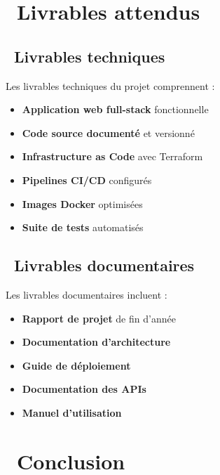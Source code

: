 \section{\faBoxes\ Livrables attendus}

\subsection{\faCode\ Livrables techniques}

Les livrables techniques du projet comprennent :

\begin{itemize}
    \item \textcolor{primaryblue}{\textbf{Application web full-stack}} fonctionnelle
    \item \textcolor{primaryblue}{\textbf{Code source documenté}} et versionné
    \item \textcolor{primaryblue}{\textbf{Infrastructure as Code}} avec Terraform
    \item \textcolor{primaryblue}{\textbf{Pipelines CI/CD}} configurés
    \item \textcolor{primaryblue}{\textbf{Images Docker}} optimisées
    \item \textcolor{primaryblue}{\textbf{Suite de tests}} automatisés
\end{itemize}

\subsection{\faFileAlt\ Livrables documentaires}

Les livrables documentaires incluent :

\begin{itemize}
    \item \textcolor{primaryblue}{\textbf{Rapport de projet}} de fin d'année
    \item \textcolor{primaryblue}{\textbf{Documentation d'architecture}}
    \item \textcolor{primaryblue}{\textbf{Guide de déploiement}}
    \item \textcolor{primaryblue}{\textbf{Documentation des APIs}}
    \item \textcolor{primaryblue}{\textbf{Manuel d'utilisation}}
\end{itemize}

\section{\faCheckCircle\ Conclusion}

